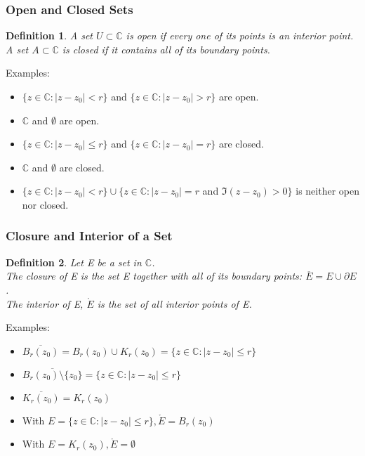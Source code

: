 \documentclass{article}
\newtheorem{definition}{Definition}[section]
\begin{document}
\subsubsection{Open and Closed Sets}
\begin{definition}
A set $U \subset \mathbb{C}$ is open if every one of its points is an interior point.\\
A set $A \subset \mathbb{C}$ is closed if it contains all of its boundary points.
\end{definition}
Examples:
\begin{itemize}
\item $\{ z \in \mathbb{C} : \left|z - z_0\right| < r \}$ and $\{ z \in \mathbb{C} : \left|z - z_0\right| > r \}$ are open.
\item $\mathbb{C}$ and $\emptyset$ are open.
\item $\{ z \in \mathbb{C} : \left|z - z_0\right| \leq r \}$ and $\{ z \in \mathbb{C} : \left|z - z_0\right| = r \}$ are closed.
\item $\mathbb{C}$ and $\emptyset$ are closed.
\item $\{ z \in \mathbb{C} : \left|z - z_0\right| < r \} \cup \{ z \in \mathbb{C} : \left|z - z_0\right| = r$ and $\Im (z - z_0) > 0\}$ is neither open nor closed.
\end{itemize}

\subsubsection{Closure and Interior of a Set}
\begin{definition}
Let E be a set in $\mathbb{C}$. \\
The closure of E is the set E together with all of its boundary points: $\overline{E} = E \cup \partial E$. \\
The interior of E, $\mathring{E}$ is the set of all interior points of E.
\end{definition}
Examples:
\begin{itemize}
\item $\overline{B_r(z_0)} = B_r(z_0) \cup K_r(z_0) = \{ z \in \mathbb{C} : \left|z - z_0\right| \leq r \}$
\item $\overline{B_r(z_0) \setminus \{ z_0 \}} = \{ z \in \mathbb{C} : \left|z - z_0\right| \leq r \}$
\item $\overline{K_r(z_0)} = K_r(z_0)$
\item With $E = \{ z \in \mathbb{C} : \left|z - z_0\right| \leq r \}, \mathring{E} = B_r(z_0)$
\item With $E = K_r(z_0), \mathring{E} = \emptyset$
\end{itemize}
\end{document}
